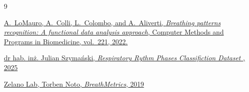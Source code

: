 \begin{thebibliography}{9}

\href{https://www.sciencedirect.com/science/article/abs/pii/S0169260722000554}
{A.~LoMauro, A.~Colli, L.~Colombo, and A.~Aliverti,
\emph{Breathing patterns recognition: A functional data analysis approach},
Computer Methods and Programs in Biomedicine,
vol.~221, 2022.}

\href{https://mostwiedzy.pl/en/open-research-data/respiratory-rythm-phases-classifiction-dataset,40910301641618-0}
{dr hab. inż. Julian Szymański,
\emph{Respiratory Rythm Phases Classifiction Dataset },
2025}

\href{https://github.com/zelanolab/breathmetrics}
{Zelano Lab, Torben Noto,
\emph{BreathMetrics},
2019}


\end{thebibliography}